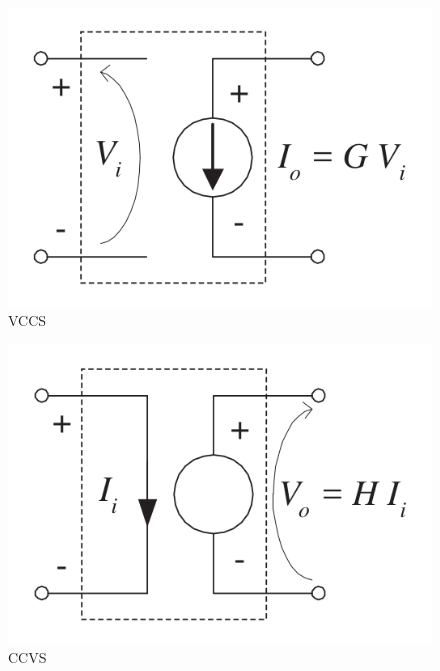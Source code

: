 \begin{defn}
	\begin{figure}[H]
		\centering
		\includegraphics[width=0.5\linewidth]{figures/VCCS.png}
		\caption{VCCS}
		\label{fig:VCCS}
	\end{figure}
    \noindent
\end{defn}

\begin{defn}
	\begin{figure}[H]
		\centering
		\includegraphics[width=0.5\linewidth]{figures/CCVS.png}
		\caption{CCVS}
		\label{fig:CCVS}
	\end{figure}
    \noindent
\end{defn}

